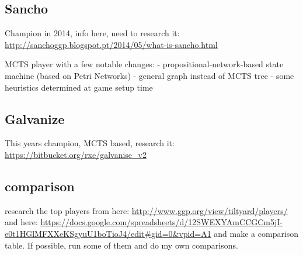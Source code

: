 \subsection{Sancho}
Champion in 2014, info here, need to research it: \url{http://sanchoggp.blogspot.pt/2014/05/what-is-sancho.html}

MCTS player with a few notable changes:
- propositional-network-based state machine (based on Petri Networks)
- general graph instead of MCTS tree
- some heuristics determined at game setup time

\subsection{Galvanize}
This years champion, MCTS based, research it:
\url{https://bitbucket.org/rxe/galvanise_v2}

\subsection{comparison}
research the top players from here:
\url{http://www.ggp.org/view/tiltyard/players/}
and here:
\url{https://docs.google.com/spreadsheets/d/12SWEXYAmCCGCm5jI-e0t1HGlMFXXeKSgyuU1boTioJ4/edit#gid=0&vpid=A1}
and make a comparison table.
If possible, run some of them and do my own comparisons.




